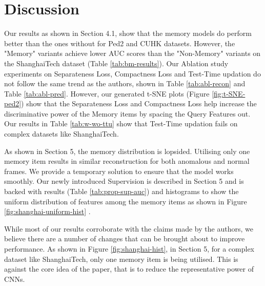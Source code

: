   \section{Discussion}
Our results as shown in Section 4.1, show that the memory models do perform better than the ones without for Ped2\cite{6739466} and CUHK\cite{6751449} datasets. However, the "Memory" variants achieve lower AUC scores than the "Non-Memory" variants on the ShanghaiTech dataset\cite{Luo2017ARO} (Table \ref{tab:bm-results}). Our Ablation study experiments on Separateness Loss, Compactness Loss and Test-Time updation do not follow the same trend as the authors, shown in Table \ref{tab:abl-recon} and Table \ref{tab:abl-pred}. However, our generated t-SNE plots (Figure \ref{fig:t-SNE-ped2}) show that the Separateness Loss and Compactness Loss help increase the discriminative power of the Memory items by spacing the Query Features out. Our results in Table \ref{tab:w-wo-ttu} show that Test-Time updation fails on complex datasets like ShanghaiTech\cite{Luo2017ARO}.

As shown in Section 5, the memory distribution is lopsided. Utilising only one memory item results in similar reconstruction for both anomalous and normal frames. We provide a temporary solution to ensure that the model works smoothly. Our newly introduced Supervision is described in Section 5 and is backed with results (Table \ref{tab:prop-sup-auc}) and histograms to show the uniform distribution of features among the memory items as shown in Figure \ref{fig:shanghai-uniform-hist} . 

While most of our results corroborate with the claims made by the authors, we believe there are a number of changes that can be brought about to improve performance. As shown in Figure \ref{fig:shanghai-hist}, in Section 5, for a complex dataset like ShanghaiTech\cite{Luo2017ARO}, only one memory item is being utilised. This is against the core idea of the paper, that is to reduce the representative power of CNNs. 

